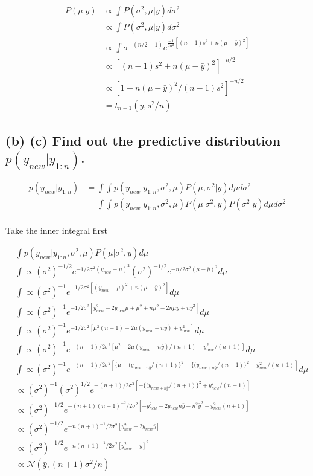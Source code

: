 \documentclass[11pt]{article}
\begin{document}
\begin{align*}
    P(\mu|y) &\propto \int P(\sigma^2, \mu|y)d\sigma^2 \\
    &\propto \int P(\sigma^2, \mu|y)d\sigma^2 \\
    &\propto \int \sigma^{-(n/2 + 1)}e^{\frac{-1}{2\sigma^2}[(n-1)s^2+n(\mu-\bar{y})^2]}\\
    &\propto [(n-1)s^2+n(\mu-\bar{y})^2]^{-n/2}\\
    &\propto [1+n(\mu-\bar{y})^2/(n-1)s^2]^{-n/2}\\
    &= t_{n-1}(\bar{y}, s^2/n)
\end{align*}


\subsection*{(b) (c) Find out the predictive distribution $p(y_{new} |y_{1:n})$.}

\begin{align*}
    p(y_{new} |y_{1:n}) &= \int \int p(y_{new} |y_{1:n}, \sigma^2, \mu)P(\mu, \sigma^2|y)d\mu d\sigma^2\\
     &= \int \int p(y_{new} |y_{1:n}, \sigma^2, \mu)P(\mu| \sigma^2,y)P(\sigma^2|y)d\mu d\sigma^2\\
\end{align*}

Take the inner integral first


\begin{align*}
  & \int p(y_{new} |y_{1:n}, \sigma^2, \mu)P(\mu| \sigma^2,y)d\mu \\
  & \int\propto (\sigma^2)^{-1/2}e^{-1/2\sigma^2(y_{new}-\mu)^2}(\sigma^2)^{-1/2}e^{-n/2\sigma^2(\mu-\bar{y})^2}d\mu\\
  & \int\propto (\sigma^2)^{-1}e^{-1/2\sigma^2[(y_{new}-\mu)^2+n(\mu-\bar{y})^2]}d\mu\\
   & \int\propto (\sigma^2)^{-1}e^{-1/2\sigma^2[y_{new}^2-2y_{new}\mu+\mu^2+n\mu^2-2n\mu\bar{y}+n\bar{y}^2]}d\mu\\
      & \int\propto (\sigma^2)^{-1}e^{-1/2\sigma^2[\mu^2(n+1)-2\mu(y_{new}+n\bar{y})+y_{new}^2]}d\mu\\
       & \int\propto (\sigma^2)^{-1}e^{-(n+1)/2\sigma^2[\mu^2-2\mu(y_{new}+n\bar{y})/(n+1)+y_{new}^2/(n+1)]}d\mu\\
       & \int\propto (\sigma^2)^{-1}e^{-(n+1)/2\sigma^2[\{\mu-(y_{new+n\bar{y}}/(n+1)\}^2-\{(y_{new+n\bar{y}}/(n+1)\}^2+y_{new}^2/(n+1)]}d\mu\\
       &\propto (\sigma^2)^{-1}(\sigma^2)^{1/2}e^{-(n+1)/2\sigma^2[-\{(y_{new+n\bar{y}}/(n+1)\}^2+y_{new}^2/(n+1)]}\\
       &\propto (\sigma^2)^{-1/2}e^{-(n+1)(n+1)^{-2}/2\sigma^2[-y_{new}^2-2y_{new}n\bar{y}-n^2\bar{y}^2+y_{new}^2(n+1)]}\\
       &\propto (\sigma^2)^{-1/2}e^{-n(n+1)^{-1}/2\sigma^2[y_{new}^2-2y_{new}\bar{y}]}\\
        &\propto (\sigma^2)^{-1/2}e^{-n(n+1)^{-1}/2\sigma^2[y_{new}^2-\bar{y}]^2}\\
        &\propto \mathcal{N}(\bar{y}, (n+1)\sigma^2/n )
\end{align*}
\end{document}
